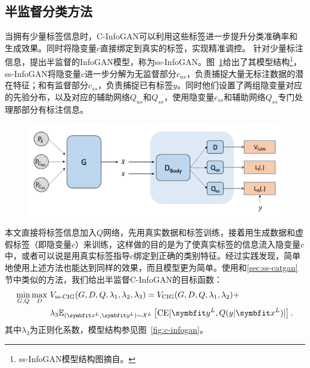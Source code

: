 \subsection{半监督分类方法}
当拥有少量标签信息时，C-InfoGAN可以利用这些标签进一步提升分类准确率和生成效果。同时将隐变量$c$直接绑定到真实的标签，实现精准调控。
针对少量标注信息，\citet{spurr2017guiding}提出半监督的InfoGAN模型，称为ss-InfoGAN。图~\ref{fig:arch-ssinfogan}给出了其模型结构\footnote{ss-InfoGAN模型结构图摘自\citet{spurr2017guiding}。}，ss-InfoGAN将隐变量$c$进一步分解为无监督部分$c_{us}$，负责捕捉大量无标注数据的潜在特征；和有监督部分$c_{ss}$，负责捕捉已有标签$y$。同时他们设置了两组隐变量对应的先验分布，以及对应的辅助网络$Q_{us}$和$Q_{ss}$，使用隐变量$c_{ss}$和辅助网络$Q_{ss}$专门处理那部分有标注信息。
\begin{figure}[htbp]
  \centering
  \includegraphics[width=\onef\textwidth]{Img/arch-ssinfogan.png}
  \label{fig:arch-ssinfogan}
\end{figure}
本文直接将标签信息加入$Q$网络，先用真实数据和标签训练，接着用生成数据和虚假标签（即隐变量$c$）来训练，这样做的目的是为了使真实标签的信息流入隐变量$c$中，或者可以说是用真实标签指导$c$绑定到正确的类别特征。经过实践发现，简单地使用上述方法也能达到同样的效果，而且模型更为简单。使用和\ref{sec:ss-catgan}节中类似的方法，我们给出半监督C-InfoGAN的目标函数：
\begin{equation}
  \begin{split}
  \min_{G,Q}\max_D~ &V_{\text{ss-CIG}}(G,D,Q,\lambda_1,\lambda_2,\lambda_3) = 
  V_{\text{CIG}}(G,D,Q,\lambda_1,\lambda_2) + \\
  &\lambda_3 \E_{(\bd{x}^L, \bd{y}^L) \sim \mathcal{X}^L}
  \left[ \CE[\bd{y}^L, Q(y|\bd{x}^L)] \right].
  \end{split}
\end{equation}
其中$\lambda_3$为正则化系数，模型结构参见图~\ref{fig:c-infogan}。

